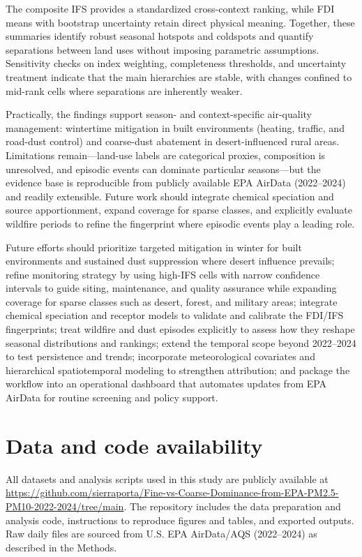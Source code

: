 \documentclass[a4paper,fleqn]{cas-sc}
\begin{document}
The composite IFS provides a standardized cross-context ranking, while FDI means with bootstrap uncertainty retain direct physical meaning. Together, these summaries identify robust seasonal hotspots and coldspots and quantify separations between land uses without imposing parametric assumptions. Sensitivity checks on index weighting, completeness thresholds, and uncertainty treatment indicate that the main hierarchies are stable, with changes confined to mid-rank cells where separations are inherently weaker.

Practically, the findings support season- and context-specific air-quality management: wintertime mitigation in built environments (heating, traffic, and road-dust control) and coarse-dust abatement in desert-influenced rural areas. Limitations remain—land-use labels are categorical proxies, composition is unresolved, and episodic events can dominate particular seasons—but the evidence base is reproducible from publicly available EPA AirData (2022–2024) and readily extensible. Future work should integrate chemical speciation and source apportionment, expand coverage for sparse classes, and explicitly evaluate wildfire periods to refine the fingerprint where episodic events play a leading role.

Future efforts should prioritize targeted mitigation in winter for built environments and sustained dust suppression where desert influence prevails; refine monitoring strategy by using high-IFS cells with narrow confidence intervals to guide siting, maintenance, and quality assurance while expanding coverage for sparse classes such as desert, forest, and military areas; integrate chemical speciation and receptor models to validate and calibrate the FDI/IFS fingerprints; treat wildfire and dust episodes explicitly to assess how they reshape seasonal distributions and rankings; extend the temporal scope beyond 2022–2024 to test persistence and trends; incorporate meteorological covariates and hierarchical spatiotemporal modeling to strengthen attribution; and package the workflow into an operational dashboard that automates updates from EPA AirData for routine screening and policy support.

\section*{Data and code availability}
All datasets and analysis scripts used in this study are publicly available at \url{https://github.com/sierraporta/Fine-vs-Coarse-Dominance-from-EPA-PM2.5-PM10-2022-2024/tree/main}.
The repository includes the data preparation and analysis code, instructions to reproduce figures and tables, and exported outputs. Raw daily files are sourced from U.S. EPA AirData/AQS (2022–2024) as described in the Methods.
\end{document}
